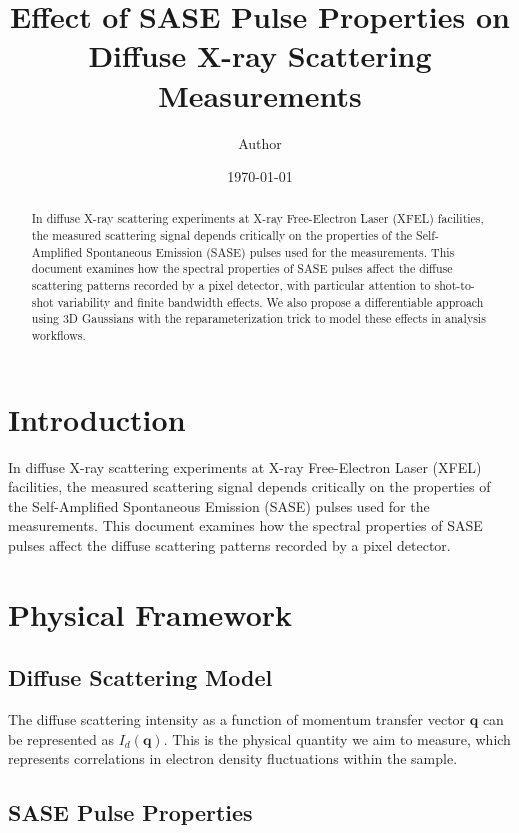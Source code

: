 \documentclass[12pt,a4paper]{article}
\title{Effect of SASE Pulse Properties on Diffuse X-ray Scattering Measurements}
\author{Author}
\date{\today}
\begin{document}
\maketitle

\begin{abstract}
In diffuse X-ray scattering experiments at X-ray Free-Electron Laser (XFEL) facilities, the measured scattering signal depends critically on the properties of the Self-Amplified Spontaneous Emission (SASE) pulses used for the measurements. This document examines how the spectral properties of SASE pulses affect the diffuse scattering patterns recorded by a pixel detector, with particular attention to shot-to-shot variability and finite bandwidth effects. We also propose a differentiable approach using 3D Gaussians with the reparameterization trick to model these effects in analysis workflows.
\end{abstract}

\section{Introduction}

In diffuse X-ray scattering experiments at X-ray Free-Electron Laser (XFEL) facilities, the measured scattering signal depends critically on the properties of the Self-Amplified Spontaneous Emission (SASE) pulses used for the measurements. This document examines how the spectral properties of SASE pulses affect the diffuse scattering patterns recorded by a pixel detector.

\section{Physical Framework}

\subsection{Diffuse Scattering Model}

The diffuse scattering intensity as a function of momentum transfer vector $\mathbf{q}$ can be represented as $I_d(\mathbf{q})$. This is the physical quantity we aim to measure, which represents correlations in electron density fluctuations within the sample.

\subsection{SASE Pulse Properties}
\end{document}
